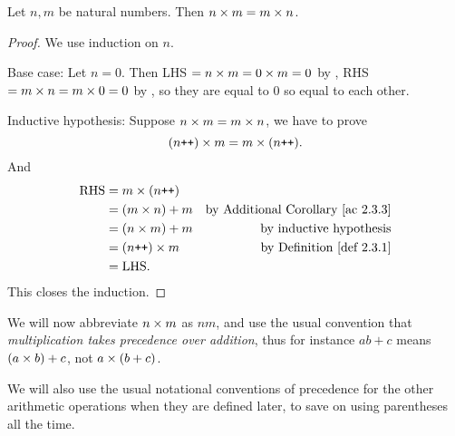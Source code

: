 \begin{lemma}\label{lem 2.3.2}
Let \(n, m\) be natural numbers. Then \(n \times m = m \times n\).
\end{lemma}
\begin{proof}
We use induction on \(n\).

Base case: Let \(n = 0\). Then LHS \(= n \times m = 0 \times m = 0\) by , RHS \(= m \times n = m \times 0 = 0\) by , so they are equal to \(0\) so equal to each other.

Inductive hypothesis: Suppose \(n \times m = m \times n\), we have to prove
\[(n\texttt{++}) \times m = m \times (n\texttt{++}).\]
And
\begin{align*}
    \text{RHS} & = m \X (n\INC) \\
               & = (m \X n) + m & \text{by \AC{2.3.3}} \\
               & = (n \X m) + m & \text{by inductive hypothesis} \\
               & = (n\INC) \X m & \text{by \DEF{2.3.1}} \\
               & = \text{LHS.}
\end{align*}
This closes the induction.
\end{proof}

\begin{note}
We will now abbreviate \(n \times m\) as \(nm\), and use the usual convention that \emph{multiplication takes precedence over addition}, thus for instance \(ab + c\) means \((a \times b)+ c\), not \(a \times (b + c)\).

We will also use the usual notational conventions of precedence for the other arithmetic operations when they are defined later, to save on using parentheses all the time.
\end{note}

